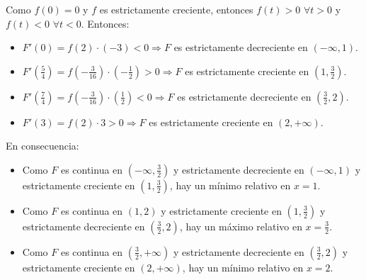 \documentclass[12pt,a4paper, reqno]{article}
\begin{document}
\begin{enumerate}
\begin{itemize}
        Como $f(0)=0$ y $f$ es estrictamente creciente, entonces $f(t)>0$ $\forall t >0$ y $f(t)<0$ $\forall t <0$. Entonces: \\
        \begin{itemize}
            \item $F'(0)=f(2)\cdot (-3) <0 \Rightarrow F$ es estrictamente decreciente en  $(- \infty, 1)$.
            \item $F'(\frac{5}{4})=f(-\frac{3}{16})\cdot (-\frac{1}{2}) >0 \Rightarrow F$ es estrictamente creciente en  $(1, \frac{3}{2})$.
            \item $F'(\frac{7}{4})=f(-\frac{3}{16})\cdot (\frac{1}{2}) <0 \Rightarrow F$ es estrictamente decreciente en  $(\frac{3}{2}, 2)$.
            \item $F'(3)=f(2)\cdot 3 >0 \Rightarrow F$ es estrictamente creciente en  $(2, + \infty)$.        \\
        \end{itemize}

        En consecuencia:
        \begin{itemize}
            \item Como $F$ es continua en $(- \infty, \frac{3}{2})$ y estrictamente decreciente en $(- \infty, 1)$ y estrictamente creciente en $(1, \frac{3}{2})$, hay un mínimo relativo en $x=1$.
            \item Como $F$ es continua en $(1,2)$ y estrictamente creciente en $(1, \frac{3}{2})$ y estrictamente decreciente en $(\frac{3}{2},2)$, hay un máximo relativo en $x=\frac{3}{2}$.
            \item Como $F$ es continua en $(\frac{3}{2}, + \infty)$ y estrictamente decreciente en $(\frac{3}{2}, 2)$ y estrictamente creciente en $(2, + \infty)$, hay un mínimo relativo en $x=2$.
        \end{itemize}

    \end{itemize}

\end{enumerate}
\end{document}
